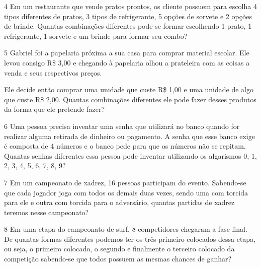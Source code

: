{\num{4} Em um restaurante que vende pratos prontos, os cliente possuem para
escolha 4 tipos diferentes de pratos, 3 tipos de refrigerante, 5 opções
de sorvete e 2 opções de brinde. Quantas combinações diferentes pode-se
formar escolhendo 1 prato, 1 refrigerante, 1 sorvete e um brinde para
formar seu combo?



\num{5} Gabriel foi a papelaria próxima a sua casa para comprar material
escolar. Ele levou consigo R\$ 3,00 e chegando à papelaria olhou a
prateleira com as coisas a venda e seus respectivos preços.


Ele decide então comprar uma unidade que custe R\$ 1,00 e uma unidade de
algo que custe R\$ 2,00. Quantas combinações diferentes ele pode fazer
desses produtos da forma que ele pretende fazer?



\num{6} Uma pessoa precisa inventar uma senha que utilizará no banco quando
for realizar alguma retirada de dinheiro ou pagamento. A senha que esse
banco exige é composta de 4 números e o banco pede para que os números
não se repitam. Quantas senhas diferentes essa pessoa pode inventar
utilizando os algarismos 0, 1, 2, 3, 4, 5, 6, 7, 8, 9?



\num{7} Em um campeonato de xadrez, 16 pessoas participam do evento.
Sabendo-se que cada jogador joga com todos os demais duas vezes, sendo
uma com torcida para ele e outra com torcida para o adversário, quantas
partidas de xadrez teremos nesse campeonato?



\num{8} Em uma etapa do campeonato de surf, 8 competidores chegaram a fase
final. De quantas formas diferentes podemos ter os três primeiro
colocados dessa etapa, ou seja, o primeiro colocado, o segundo e
finalmente o terceiro colocado da competição sabendo-se que todos
possuem as mesmas chances de ganhar?

}
